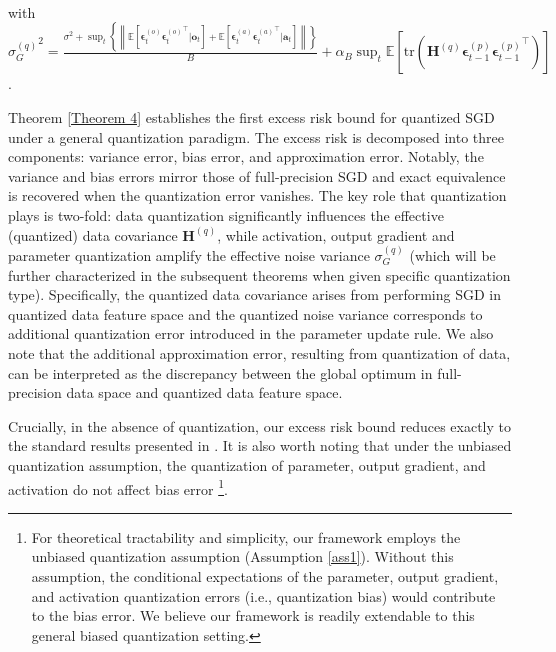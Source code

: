 \documentclass[11pt, letterpaper]{article}
\begin{document}
\begin{theorem}
\begin{equation*}
\begin{aligned}
        \end{aligned}
    \end{equation*}
    with ${\sigma_G^{(q)}}^2=\frac{\sigma^2+\sup_t \left\{\left\|\mathbb{E}\left[\boldsymbol{\epsilon}_t^{(o)}{\boldsymbol{\epsilon}_t^{(o)}}^\top|\mathbf{o}_t\right]+\mathbb{E}\left[\boldsymbol{\epsilon}_t^{(a)}{\boldsymbol{\epsilon}_t^{(a)}}^\top|\mathbf{a}_t\right] \right\|\right\}}{B}+\alpha_B\sup_t\mathbb{E}\left[\mathrm{tr}\left(\mathbf{H}^{(q)} \boldsymbol{\epsilon}_{t-1}^{(p)}{\boldsymbol{\epsilon}_{t-1}^{(p)}}^\top\right)\right]$.
        
\end{theorem}

Theorem \ref{Theorem 4} establishes the first excess risk bound for quantized SGD under a general quantization paradigm. The excess risk is decomposed into three components: variance error, bias error, and approximation error. Notably, the variance and bias errors mirror those of full-precision SGD \citep{zou2023benign} and exact equivalence is recovered when the quantization error vanishes. The key role that quantization plays is two-fold: data quantization significantly influences the effective (quantized) data covariance $\mathbf{H}^{(q)}$, while activation, output gradient and parameter quantization amplify the effective noise variance $\sigma_G^{(q)}$ (which will be further characterized in the subsequent theorems when given specific quantization type). Specifically, the quantized data covariance arises from performing SGD in quantized data feature space and the quantized noise variance corresponds to additional quantization error introduced in the parameter update rule. We also note that the additional approximation error, resulting from quantization of data, can be interpreted as the discrepancy between the global optimum in full-precision data space and quantized data feature space. 

Crucially, in the absence of quantization, our excess risk bound reduces exactly to the standard results presented in \citet{zou2023benign}. It is also worth noting that under the unbiased quantization assumption, the quantization of parameter, output gradient, and activation do not affect bias error \footnote{For theoretical tractability and simplicity, our framework employs the unbiased quantization assumption (Assumption \ref{ass1}). Without this assumption, the conditional expectations of the parameter, output gradient, and activation quantization errors (i.e., quantization bias) would contribute to the bias error. We believe our framework is readily extendable to this general biased quantization setting.}.
\end{document}
